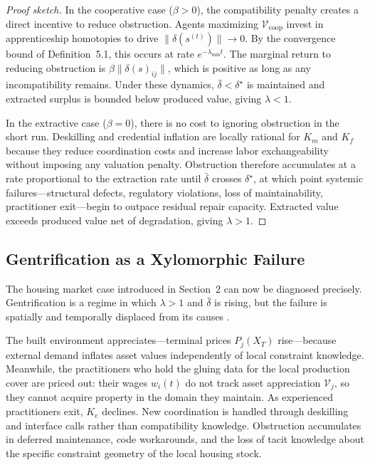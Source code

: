\documentclass[12pt]{article}
\begin{document}
\begin{proof}[Proof sketch]
In the cooperative case ($\beta > 0$), the compatibility penalty creates a direct incentive to reduce obstruction. Agents maximizing $\mathcal{V}_{\mathrm{coop}}$ invest in apprenticeship homotopies to drive $\|\delta(s^{(t)})\| \to 0$. By the convergence bound of Definition~5.1, this occurs at rate $e^{-\lambda_{\min} t}$. The marginal return to reducing obstruction is $\beta\|\delta(s)_{ij}\|$, which is positive as long as any incompatibility remains. Under these dynamics, $\bar{\delta} < \delta^\star$ is maintained and extracted surplus is bounded below produced value, giving $\lambda < 1$.

In the extractive case ($\beta = 0$), there is no cost to ignoring obstruction in the short run. Deskilling and credential inflation are locally rational for $K_m$ and $K_f$ because they reduce coordination costs and increase labor exchangeability without imposing any valuation penalty. Obstruction therefore accumulates at a rate proportional to the extraction rate until $\bar{\delta}$ crosses $\delta^\star$, at which point systemic failures---structural defects, regulatory violations, loss of maintainability, practitioner exit---begin to outpace residual repair capacity. Extracted value exceeds produced value net of degradation, giving $\lambda > 1$.
\end{proof}

\subsection{Gentrification as a Xylomorphic Failure}

The housing market case introduced in Section~2 can now be diagnosed precisely. Gentrification is a regime in which $\lambda > 1$ and $\bar{\delta}$ is rising, but the failure is spatially and temporally displaced from its causes \cite{Jacobs1961,Harvey2005,Scott1998}.

The built environment appreciates---terminal prices $P_j(X_T)$ rise---because external demand inflates asset values independently of local constraint knowledge. Meanwhile, the practitioners who hold the gluing data for the local production cover are priced out: their wages $w_i(t)$ do not track asset appreciation $\mathcal{V}_j$, so they cannot acquire property in the domain they maintain. As experienced practitioners exit, $K_e$ declines. New coordination is handled through deskilling and interface calls rather than compatibility knowledge. Obstruction accumulates in deferred maintenance, code workarounds, and the loss of tacit knowledge about the specific constraint geometry of the local housing stock.
\end{document}
